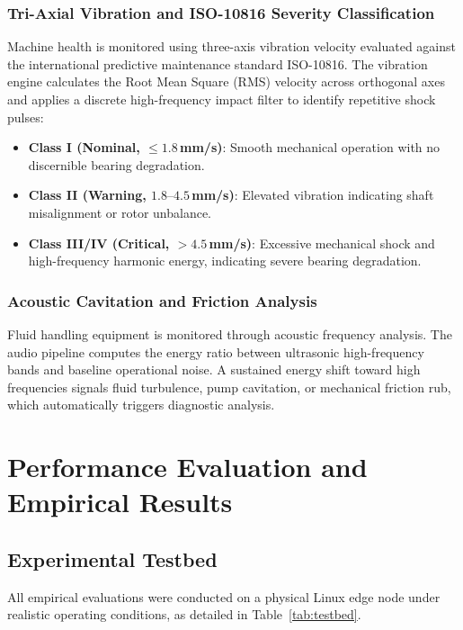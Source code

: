 \documentclass[conference]{IEEEtran}
\begin{document}
    \subsubsection{Tri-Axial Vibration and ISO-10816 Severity Classification}
    Machine health is monitored using three-axis vibration velocity evaluated against the international predictive maintenance standard ISO-10816. The vibration
    engine calculates the Root Mean Square (RMS) velocity across orthogonal axes and applies a discrete high-frequency impact filter to identify repetitive shock
    pulses:
    \begin{itemize}
        \item \textbf{Class I (Nominal, $\le 1.8$\,mm/s)}: Smooth mechanical operation with no discernible bearing degradation.
        \item \textbf{Class II (Warning, $1.8\text{--}4.5$\,mm/s)}: Elevated vibration indicating shaft misalignment or rotor unbalance.
        \item \textbf{Class III/IV (Critical, $>4.5$\,mm/s)}: Excessive mechanical shock and high-frequency harmonic energy, indicating severe bearing degradation.
    \end{itemize}

    \subsubsection{Acoustic Cavitation and Friction Analysis}
    Fluid handling equipment is monitored through acoustic frequency analysis. The audio pipeline computes the energy ratio between ultrasonic high-frequency bands
    and baseline operational noise. A sustained energy shift toward high frequencies signals fluid turbulence, pump cavitation, or mechanical friction rub, which
    automatically triggers diagnostic analysis.
    
    \section{Performance Evaluation and Empirical Results}
    
    \subsection{Experimental Testbed}
    All empirical evaluations were conducted on a physical Linux edge node under realistic operating conditions, as detailed in Table~\ref{tab:testbed}.
    
\end{document}
